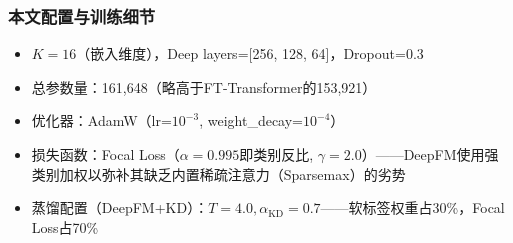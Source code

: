 \subsubsection{本文配置与训练细节}

\begin{itemize}
    \item $K=16$（嵌入维度），Deep layers=[256, 128, 64]，Dropout=0.3
    \item 总参数量：161,648（略高于FT-Transformer的153,921）
    \item 优化器：AdamW（lr=$10^{-3}$, weight\_decay=$10^{-4}$）
    \item 损失函数：Focal Loss（$\alpha=0.995$即类别反比, $\gamma=2.0$）——DeepFM使用强类别加权以弥补其缺乏内置稀疏注意力（Sparsemax）的劣势
    \item 蒸馏配置（DeepFM+KD）：$T=4.0, \alpha_{\mathrm{KD}}=0.7$——软标签权重占30\%，Focal Loss占70\%
\end{itemize}
